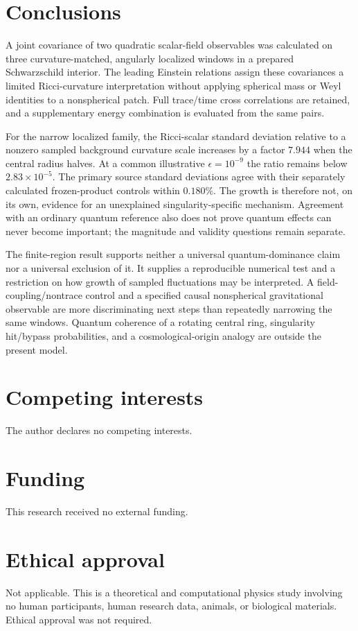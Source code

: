 \documentclass[aps,prd,reprint,floatfix,nofootinbib,longbibliography]{revtex4-2}
\newcommand{\ee}{\epsilon}
\begin{document}
\section{Conclusions}
A joint covariance of two quadratic scalar-field observables was calculated on three curvature-matched, angularly localized windows in a prepared Schwarzschild interior. The leading Einstein relations assign these covariances a limited Ricci-curvature interpretation without applying spherical mass or Weyl identities to a nonspherical patch. Full trace/time cross correlations are retained, and a supplementary energy combination is evaluated from the same pairs.

For the narrow localized family, the Ricci-scalar standard deviation relative to a nonzero sampled background curvature scale increases by a factor $7.944$ when the central radius halves. At a common illustrative $\ee=10^{-9}$ the ratio remains below $2.83\times10^{-5}$. The primary source standard deviations agree with their separately calculated frozen-product controls within $0.180\%$. The growth is therefore not, on its own, evidence for an unexplained singularity-specific mechanism. Agreement with an ordinary quantum reference also does not prove quantum effects can never become important; the magnitude and validity questions remain separate.

The finite-region result supports neither a universal quantum-dominance claim nor a universal exclusion of it. It supplies a reproducible numerical test and a restriction on how growth of sampled fluctuations may be interpreted. A field-coupling/nontrace control and a specified causal nonspherical gravitational observable are more discriminating next steps than repeatedly narrowing the same windows. Quantum coherence of a rotating central ring, singularity hit/bypass probabilities, and a cosmological-origin analogy are outside the present model.

\section*{Competing interests}
The author declares no competing interests.

\section*{Funding}
This research received no external funding.

\section*{Ethical approval}
Not applicable. This is a theoretical and computational physics study involving no human participants, human research data, animals, or biological materials. Ethical approval was not required.
\end{document}
